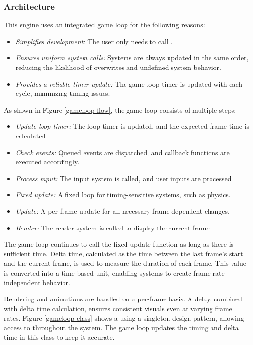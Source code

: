 \documentclass{projdoc}
\begin{document}
\subsubsection{Architecture}
This engine uses an integrated game loop for the following reasons:
\begin{itemize}
	\item \emph{Simplifies development:} The user only needs to call .
	\item \emph{Ensures uniform system calls:} Systems are always updated in the same order, reducing the likelihood of overwrites and undefined system behavior.
	\item \emph{Provides a reliable timer update:} The game loop timer is updated with each cycle, minimizing timing issues.
\end{itemize}
As shown in Figure \ref{gameloop-flow}, the game loop consists of multiple steps:
\begin{itemize}
	\item \emph{Update loop timer:} The loop timer is updated, and the expected frame time is calculated.
	\item \emph{Check events:} Queued events are dispatched, and callback functions are executed accordingly.
	\item \emph{Process input:} The input system is called, and user inputs are processed.
	\item \emph{Fixed update:} A fixed loop for timing-sensitive systems, such as physics.
	\item \emph{Update:} A per-frame update for all necessary frame-dependent changes.
	\item \emph{Render:} The render system is called to display the current frame.
\end{itemize}
The game loop continues to call the fixed update function as long as there is sufficient time. Delta time, calculated as the time between the last frame’s start and the current frame, is used to measure the duration of each frame. This value is converted into a time-based unit, enabling systems to create frame rate-independent behavior.

Rendering and animations are handled on a per-frame basis. A delay, combined with delta time calculation, ensures consistent visuals even at varying frame rates. Figure \ref{gameloop-class} shows a  using a singleton design pattern, allowing access to  throughout the system. The game loop updates the timing and delta time in this class to keep it accurate.
\end{document}
